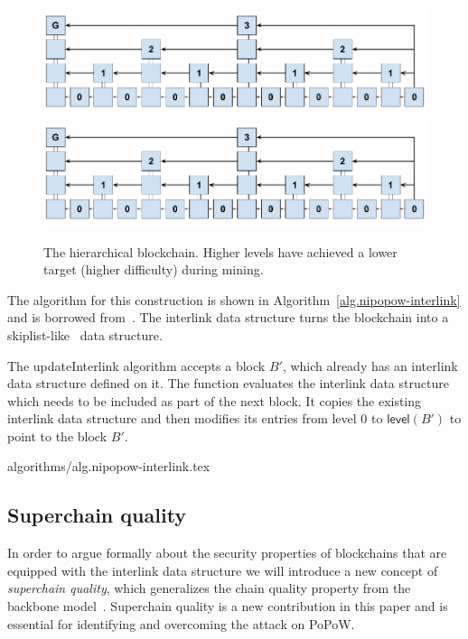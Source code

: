 \begin{figure}
    \caption{The hierarchical blockchain.
    Higher levels have achieved a lower target (higher difficulty) during mining.}
    \centering
    \iftwocolumn
        \includegraphics[width=\columnwidth,keepaspectratio]{figures/hierarchical-ledger.png}
    \else
        \includegraphics[width=0.7\columnwidth,keepaspectratio]{figures/hierarchical-ledger.png}
    \fi
    \label{fig.hierarchy}
\end{figure}

The algorithm for this construction is shown in
Algorithm~\ref{alg.nipopow-interlink} and is borrowed from~\cite{KLS}. The
interlink data structure turns the blockchain into a
skiplist-like~\cite{skiplist} data structure.

The updateInterlink algorithm accepts a block $B'$, which already has an
interlink data structure defined on it. The function evaluates the
interlink data structure which needs to be included as part of the next block.
It copies the existing interlink data structure and
then modifies its entries from level $0$ to $\textsf{level}(B')$ to
point to the block $B'$.

{algorithms/alg.nipopow-interlink.tex}

\subsection{Superchain quality}
In order to argue formally about the security properties of blockchains that are
equipped with the interlink data structure we will introduce a new concept of
{\em superchain quality}, which generalizes the chain quality property from the
backbone model~\cite{backbone}. Superchain quality is a new contribution in this
paper and is essential for identifying and overcoming the attack on PoPoW.

